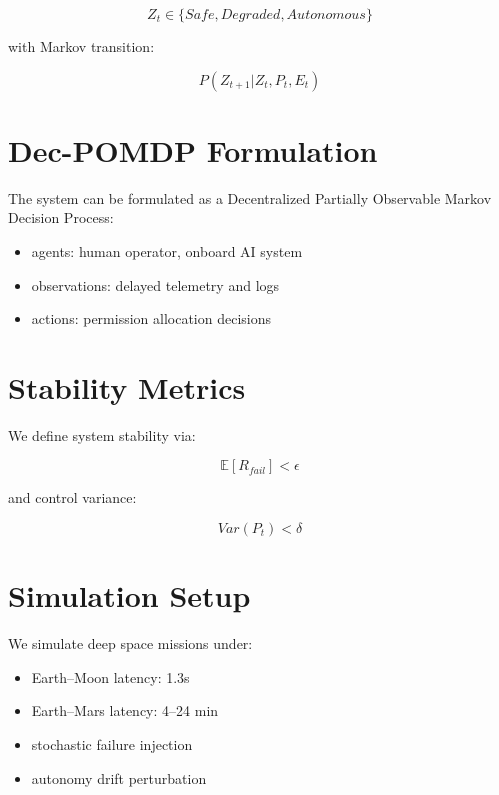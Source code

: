 \documentclass[conference]{IEEEtran}
\begin{document}
\begin{equation}
Z_t \in \{Safe, Degraded, Autonomous\}
\end{equation}

with Markov transition:

\begin{equation}
P(Z_{t+1} | Z_t, P_t, E_t)
\end{equation}

\section{Dec-POMDP Formulation}

The system can be formulated as a Decentralized Partially Observable Markov Decision Process:

\begin{itemize}
\item agents: human operator, onboard AI system
\item observations: delayed telemetry and logs
\item actions: permission allocation decisions
\end{itemize}

\section{Stability Metrics}

We define system stability via:

\begin{equation}
\mathbb{E}[R_{fail}] < \epsilon
\end{equation}

and control variance:

\begin{equation}
Var(P_t) < \delta
\end{equation}

\section{Simulation Setup}

We simulate deep space missions under:

\begin{itemize}
\item Earth--Moon latency: 1.3s
\item Earth--Mars latency: 4--24 min
\item stochastic failure injection
\item autonomy drift perturbation
\end{itemize}
\end{document}
